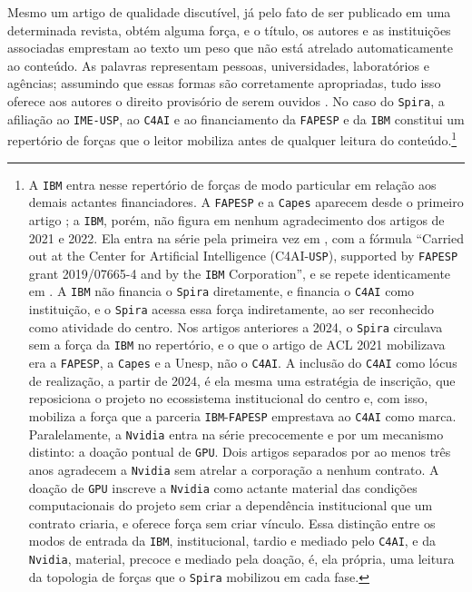 Mesmo um artigo de qualidade discutível, já pelo fato de ser publicado em uma determinada revista, obtém alguma força, e o título, os autores e as instituições associadas emprestam ao texto um peso que não está atrelado automaticamente ao conteúdo. As palavras representam pessoas, universidades, laboratórios e agências; assumindo que essas formas são corretamente apropriadas, tudo isso oferece aos autores o direito provisório de serem ouvidos \parencite{Law1986Laboratories}. No caso do \texttt{Spira}, a afiliação ao \texttt{IME-USP}, ao \texttt{C4AI} e ao financiamento da \texttt{FAPESP} e da \texttt{IBM} constitui um repertório de forças que o leitor mobiliza antes de qualquer leitura do conteúdo.\footnote{A \texttt{IBM} entra nesse repertório de forças de modo particular em relação aos demais actantes financiadores. A \texttt{FAPESP} e a \texttt{Capes} aparecem desde o primeiro artigo \parencite{Casanova2021DeepLearning}; a \texttt{IBM}, porém, não figura em nenhum agradecimento dos artigos de 2021 e 2022. Ela entra na série pela primeira vez em \textcite{Gauy2024Discriminant}, com a fórmula \enquote{Carried out at the Center for Artificial Intelligence (C4AI-\texttt{USP}), supported by \texttt{FAPESP} grant 2019/07665-4 and by the \texttt{IBM} Corporation}, e se repete identicamente em \textcite{Finger2025SPIRABM}. A \texttt{IBM} não financia o \texttt{Spira} diretamente, e financia o \texttt{C4AI} como instituição, e o \texttt{Spira} acessa essa força indiretamente, ao ser reconhecido como atividade do centro. Nos artigos anteriores a 2024, o \texttt{Spira} circulava sem a força da \texttt{IBM} no repertório, e o que o artigo de ACL 2021 mobilizava era a \texttt{FAPESP}, a \texttt{Capes} e a Unesp, não o \texttt{C4AI}. A inclusão do \texttt{C4AI} como lócus de realização, a partir de 2024, é ela mesma uma estratégia de inscrição, que reposiciona o projeto no ecossistema institucional do centro e, com isso, mobiliza a força que a parceria \texttt{IBM}-\texttt{FAPESP} emprestava ao \texttt{C4AI} como marca. Paralelamente, a \texttt{Nvidia} entra na série precocemente e por um mecanismo distinto: a doação pontual de \texttt{GPU}. Dois artigos separados por ao menos três anos \parencite{Casanova2021DeepLearning,Silva2022Interpretability} agradecem a \texttt{Nvidia} sem atrelar a corporação a nenhum contrato. A doação de \texttt{GPU} inscreve a \texttt{Nvidia} como actante material das condições computacionais do projeto sem criar a dependência institucional que um contrato criaria, e oferece força sem criar vínculo. Essa distinção entre os modos de entrada da \texttt{IBM}, institucional, tardio e mediado pelo \texttt{C4AI}, e da \texttt{Nvidia}, material, precoce e mediado pela doação, é, ela própria, uma leitura da topologia de forças que o \texttt{Spira} mobilizou em cada fase.}

